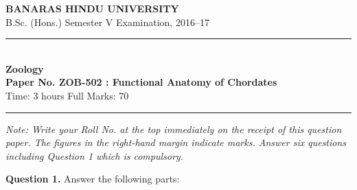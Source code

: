 \documentclass[11pt,a4paper]{article}
\begin{document}
\begin{center}
  {\large\bfseries BANARAS HINDU UNIVERSITY}\\[2pt]
  {\normalsize B.Sc. (Hons.) Semester V Examination, 2016--17}\\[6pt]
  \rule{0.8\linewidth}{0.5pt}\\[6pt]
  {\large\bfseries Zoology}\\[4pt]
  {\large\bfseries Paper No. ZOB-502 : Functional Anatomy of Chordates}\\[4pt]
  {\normalsize Time: 3 hours \hfill Full Marks: 70}
\end{center}

\rule{\linewidth}{0.4pt}

\smallskip



\noindent   \textit{Note: Write your Roll No. at the top immediately on the receipt of this question paper. The figures in the right-hand margin indicate marks. Answer six questions including Question 1 which is compulsory.}

\bigskip



\noindent   \textbf{Question 1.} Answer the following parts:
\end{document}
